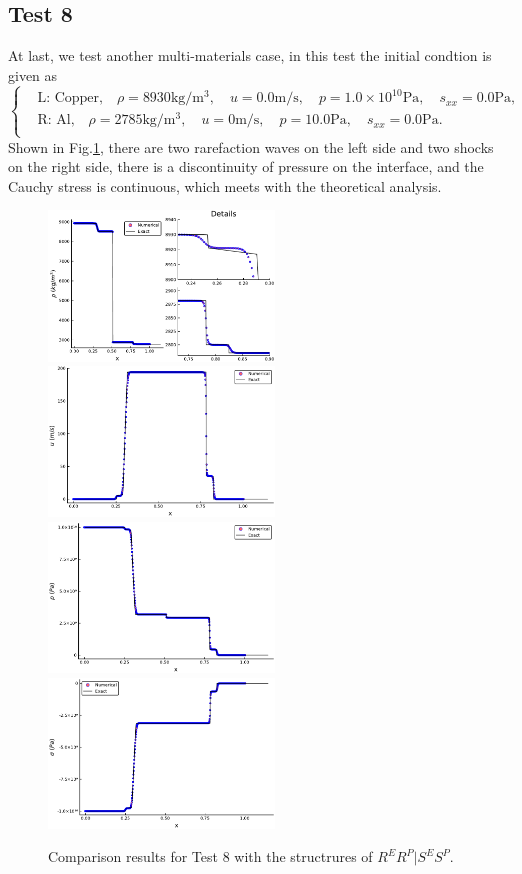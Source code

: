 \documentclass[review]{elsarticle}
\begin{document}
\subsection{Test 8}
At last, we test another multi-materials case, in this test the initial condtion is given as 
\begin{equation}
 \left\{ \begin{aligned}
	 &	 \text{L: Copper,}\quad  \rho = 8930 \text{kg}/\text{m}^3, \quad  u = 0.0\text{m}/\text{s}, \quad  p = 1.0\times 10^{10}\text{Pa}, \quad  s_{xx}=0.0 \text{Pa},\\
	 &	 \text{R: Al,}\quad  \rho = 2785 \text{kg}/\text{m}^3, \quad  u = 0\text{m}/\text{s}, \quad  p = 10.0 \text{Pa}, \quad  s_{xx}=0.0 \text{Pa}.\\
   \end{aligned}
 \right.
\end{equation}
Shown in Fig.\ref{fig:case8}, there are two rarefaction waves on the left side and two shocks on the right side, there is a discontinuity of pressure on the interface, and the Cauchy stress is continuous, which  meets with the theoretical analysis.  
\begin{figure}
  \centering
  \includegraphics[width= 6cm] {case8rho.pdf}
  \includegraphics[width= 6cm] {case8u.pdf}
  \includegraphics[width= 6cm] {case8p.pdf}
  \includegraphics[width= 6cm] {case8sigma.pdf}

    \caption{Comparison results for Test 8 with the structrures of $R^ER^P|S^ES^P$.  }
  \label{fig:case8}
\end{figure}
\end{document}

